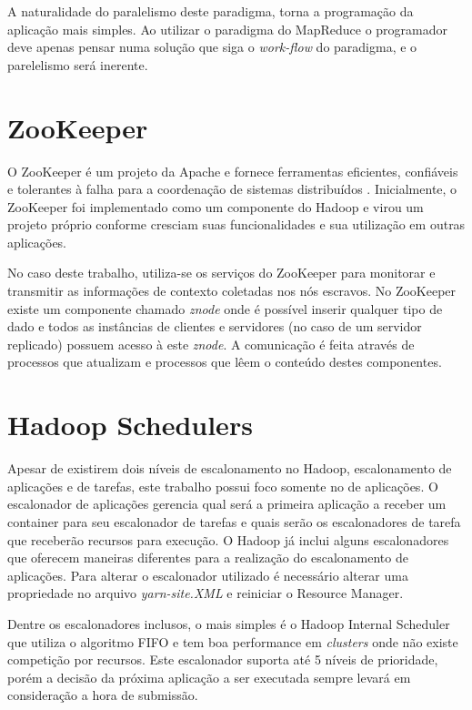 A naturalidade do paralelismo deste paradigma, torna a programação da aplicação mais simples. Ao utilizar o paradigma do MapReduce o programador deve apenas pensar numa solução que siga o \textit{work-flow} do paradigma, e o parelelismo será inerente.

\section{ZooKeeper}
O ZooKeeper é um projeto da Apache e fornece ferramentas eficientes, confiáveis e tolerantes à falha para a coordenação de sistemas distribuídos \cite{Hunt2010}. Inicialmente, o ZooKeeper foi implementado como um componente do Hadoop e virou um projeto próprio conforme cresciam suas funcionalidades e sua utilização em outras aplicações. 

No caso deste trabalho, utiliza-se os serviços do ZooKeeper para monitorar e transmitir as informações de contexto coletadas nos nós escravos. No ZooKeeper existe um componente chamado \textit{znode} onde é possível inserir qualquer tipo de dado e todos as instâncias de clientes e servidores (no caso de um servidor replicado) possuem acesso à este \textit{znode}. A comunicação é feita através de processos que atualizam e processos que lêem o conteúdo destes componentes.



\section{Hadoop Schedulers}
\label{sec:HadSched}
Apesar de existirem dois níveis de escalonamento no Hadoop, escalonamento de aplicações e de tarefas, este trabalho possui foco somente no de aplicações. O escalonador de aplicações gerencia qual será a primeira aplicação a receber um container para seu escalonador de tarefas e quais serão os escalonadores de tarefa que receberão recursos para execução. O Hadoop já inclui alguns escalonadores que oferecem maneiras diferentes para a realização do escalonamento de aplicações. Para alterar o escalonador utilizado é necessário alterar uma propriedade no arquivo \textit{yarn-site.XML} e reiniciar o Resource Manager.

Dentre os escalonadores inclusos, o mais simples é o Hadoop Internal Scheduler que utiliza o algoritmo FIFO e tem boa performance em \textit{clusters} onde não existe competição por recursos. Este escalonador suporta até 5 níveis de prioridade, porém a decisão da próxima aplicação a ser executada sempre levará em consideração a hora de submissão.

